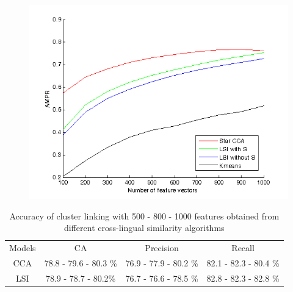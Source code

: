 \documentclass[twoside,11pt]{article}
\begin{document}
\begin{figure}
\label{pic:AMPR}
\includegraphics{slika.png}
\end{figure}
\begin{table}[h]
\caption{Accuracy of cluster linking with 500 - 800 - 1000 features obtained from different cross-lingual similarity algorithms}
\label{table:linkingEvalAlgosMulti}
\begin{center}
\begin{tabular}{|c|c|c|c|}
  \hline
  \cline{1-4}
  Models & CA & Precision & Recall \\ \cline{1-4}
  CCA & 78.8 - 79.6 - 80.3 \% & 76.9 - 77.9 - 80.2 \%  & 82.1 - 82.3 - 80.4 \%  \\ \cline{1-4}
  LSI & 78.9 - 78.7 - 80.2\% & 76.7 - 76.6 - 78.5 \%  & 82.8 - 82.3 - 82.8 \%  \\ \cline{1-4}
  \hline
\end{tabular}
\end{center}
\end{table}
\end{document}
